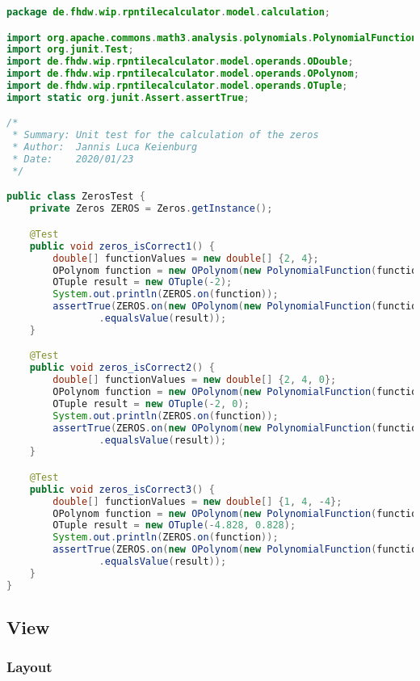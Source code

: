 \begin{lstlisting}[caption=ZerosTest (Keienburg),label=list:ZerosTest,language=Java]
package de.fhdw.wip.rpntilecalculator.model.calculation;

import org.apache.commons.math3.analysis.polynomials.PolynomialFunction;
import org.junit.Test;
import de.fhdw.wip.rpntilecalculator.model.operands.ODouble;
import de.fhdw.wip.rpntilecalculator.model.operands.OPolynom;
import de.fhdw.wip.rpntilecalculator.model.operands.OTuple;
import static org.junit.Assert.assertTrue;

/*
 * Summary: Unit test for the calculation of the zeros
 * Author:  Jannis Luca Keienburg
 * Date:    2020/01/23
 */

public class ZerosTest {
    private Zeros ZEROS = Zeros.getInstance();

    @Test
    public void zeros_isCorrect1() {
        double[] functionValues = new double[] {2, 4};
        OPolynom function = new OPolynom(new PolynomialFunction(functionValues));
        OTuple result = new OTuple(-2);
        System.out.println(ZEROS.on(function));
        assertTrue(ZEROS.on(new OPolynom(new PolynomialFunction(functionValues)))
                .equalsValue(result));
    }

    @Test
    public void zeros_isCorrect2() {
        double[] functionValues = new double[] {2, 4, 0};
        OPolynom function = new OPolynom(new PolynomialFunction(functionValues));
        OTuple result = new OTuple(-2, 0);
        System.out.println(ZEROS.on(function));
        assertTrue(ZEROS.on(new OPolynom(new PolynomialFunction(functionValues)))
                .equalsValue(result));
    }

    @Test
    public void zeros_isCorrect3() {
        double[] functionValues = new double[] {1, 4, -4};
        OPolynom function = new OPolynom(new PolynomialFunction(functionValues));
        OTuple result = new OTuple(-4.828, 0.828);
        System.out.println(ZEROS.on(function));
        assertTrue(ZEROS.on(new OPolynom(new PolynomialFunction(functionValues)))
                .equalsValue(result));
    }
}
\end{lstlisting} 

\subsection{View}

\subsubsection{Layout}

